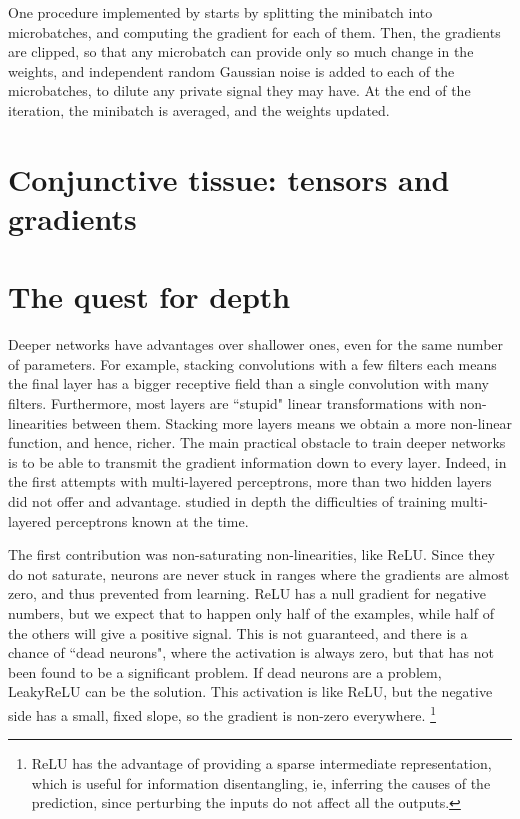 One procedure implemented by \citet{tf_privacy} starts by splitting the minibatch into microbatches, and computing the gradient for each of them.
Then, the gradients are clipped, so that any microbatch can provide only so much change in the weights, and independent random Gaussian noise is added to each of the microbatches, to dilute any private signal they may have.
At the end of the iteration, the minibatch is averaged, and the weights updated.


\section[Tensors and gradients]{Conjunctive tissue: tensors and gradients}


\section{The quest for depth}
Deeper networks have advantages over shallower ones, even for the same number of parameters.
For example, stacking convolutions with a few filters each means the final layer has a bigger receptive field than a single convolution with many filters.
Furthermore, most layers are ``stupid" linear transformations with non-linearities between them.
Stacking more layers means we obtain a more non-linear function, and hence, richer.
The main practical obstacle to train deeper networks is to be able to transmit the gradient information down to every layer.
Indeed, in the first attempts with multi-layered perceptrons, more than two hidden layers did not offer and advantage.
\citet{glorot} studied in depth the difficulties of training multi-layered perceptrons known at the time.

The first contribution  was non-saturating non-linearities, like ReLU.
Since they do not saturate, neurons are never stuck in ranges where the gradients are almost zero, and thus prevented from learning.
ReLU has a null gradient for negative numbers, but we expect that to happen only half of the examples, while half of the others will give a positive signal.
This is not guaranteed, and there is a chance of ``dead neurons", where the activation is always zero, but that has not been found to be a significant problem.
If dead neurons are a problem, LeakyReLU   can be the solution.
This activation is like ReLU, but the negative side has a small, fixed slope, so the gradient is non-zero everywhere.
\footnote{ReLU has the advantage of providing a sparse intermediate representation, which is useful for information disentangling, ie, inferring the causes of the prediction, since perturbing the inputs do not affect all the outputs.}

